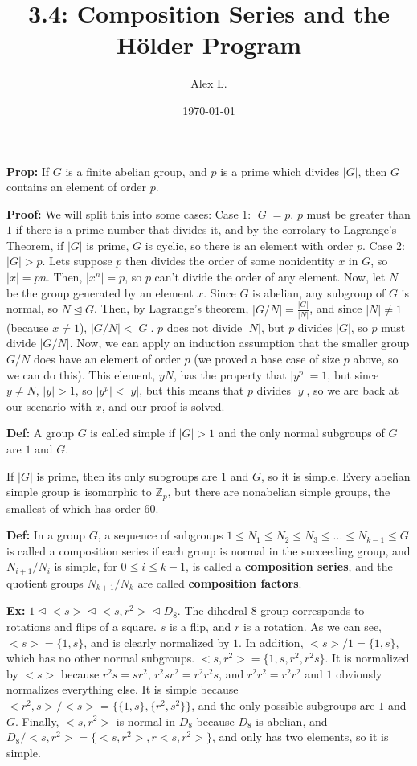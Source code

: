 \documentclass{article}
\title{3.4: Composition Series and the H\"older Program}
\author{Alex L.}
\date{\today}
\begin{document}
\maketitle

\textbf{Prop:} If $G$ is a finite abelian group, and $p$ is a prime which divides $\vert G \vert$, then $G$ contains an element of order $p$.

\textbf{Proof:} We will split this into some cases: Case 1: $\vert G \vert = p$. $p$ must be greater than $1$ if there is a prime number that divides it, and by the corrolary to Lagrange's Theorem, if $\vert G \vert$ is prime, $G$ is cyclic, so there is an element with order $p$. Case 2: $\vert G \vert > p$. Lets suppose $p$ then divides the order of some nonidentity $x$ in $G$, so $\vert x \vert = pn$. Then, $\vert x^n \vert = p$, so $p$ can't divide the order of any element. Now, let $N$ be the group generated by an element $x$. Since $G$ is abelian, any subgroup of $G$ is normal, so $N \trianglelefteq G$. Then, by Lagrange's theorem, $\vert G/N\vert = \frac{\vert G \vert}{\vert N \vert}$, and since $\vert N \vert \neq 1$ (because $x \neq 1$), $\vert G/N \vert < \vert G \vert$. $p$ does not divide $\vert N\vert$, but $p$ divides $\vert G\vert$, so $p$ must divide $\vert G/N\vert$. Now, we can apply an induction assumption that the smaller group $G/N$ does have an element of order $p$ (we proved a base case of size $p$ above, so we can do this). This element, $yN$, has the property that $\vert y^p\vert = 1$, but since $y \neq N$, $\vert y\vert > 1$, so $\vert y^p \vert < \vert y\vert$, but this means that $p$ divides $\vert y\vert$, so we are back at our scenario with $x$, and our proof is solved. 

\textbf{Def:} A group $G$ is called simple if $\vert G\vert > 1$ and the only normal subgroups of $G$ are $1$ and $G$.

If $\vert G\vert$ is prime, then its only subgroups are $1$ and $G$, so it is simple. Every abelian simple group is isomorphic to $\mathbb{Z}_p$, but there are nonabelian simple groups, the smallest of which has order $60$. 

\textbf{Def:} In a group $G$, a sequence of subgroups $1 \leq N_1 \leq N_2 \leq N_3 \leq ... \leq N_{k-1} \leq G$ is called a composition series if each group is normal in the succeeding group, and $N_{i+1}/N_i$ is simple, for $0 \leq i \leq k-1$, is called a \textbf{composition series}, and the quotient groups $N_{k+1}/N_k$ are called \textbf{composition factors}.

\textbf{Ex:} $1 \trianglelefteq <s> \trianglelefteq <s,r^2> \trianglelefteq D_8$. The dihedral $8$ group corresponds to rotations and flips of a square. $s$ is a flip, and $r$ is a rotation. As we can see, $<s> = \{1,s\}$, and is clearly normalized by $1$. In addition, $<s>/1 = \{1,s\}$, which has no other normal subgroups. $<s,r^2> = \{1,s,r^2, r^2s\}$. It is normalized by $<s>$ because $r^2s = sr^2$, $r^2sr^2 = r^2r^2s$, and $r^2r^2 = r^2r^2$ and $1$ obviously normalizes everything else. It is simple because $<r^2,s>/<s> = \{\{1,s\},\{r^2, s^2\}\}$, and the only possible subgroups are $1$ and $G$. Finally, $<s,r^2>$ is normal in $D_8$ because $D_8$ is abelian, and $D_8 / <s,r^2> = \{<s,r^2>,r<s,r^2>\}$, and only has two elements, so it is simple. 
\end{document}
